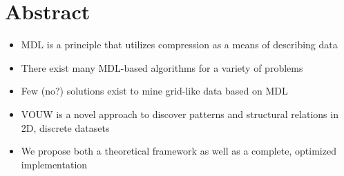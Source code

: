 \documentclass[a4paper,notoc,oneside]{tufte-book}
\begin{document}
\chapter*{Abstract}
\begin{itemize}
\item MDL is a principle that utilizes compression as a means of describing data
\item There exist many MDL-based algorithms for a variety of problems
\item Few (no?) solutions exist to mine grid-like data based on MDL
\item VOUW is a novel approach to discover patterns and structural relations in 2D, discrete datasets
\item We propose both a theoretical framework as well as a complete, optimized implementation 
\end{itemize}
\end{document}
